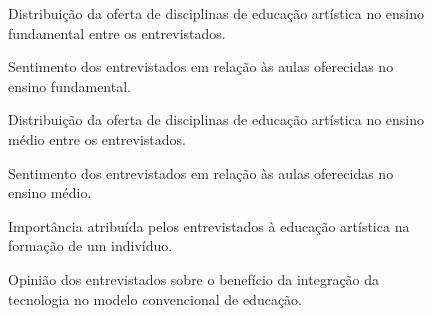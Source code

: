 \documentclass{article}
\begin{document}
	\newpage
	\begin{figure}[H]
		\centering
		\caption{Distribuição da oferta de disciplinas de educação artística no ensino fundamental entre os entrevistados.}
		\label{fig:q4}
	\end{figure}

	\newpage
	\begin{figure}[H]
		\centering
		\caption{Sentimento dos entrevistados em relação às aulas oferecidas no ensino fundamental.}
		\label{fig:q5}
	\end{figure}

	\newpage
	\begin{figure}[H]
		\centering
		\caption{Distribuição da oferta de disciplinas de educação artística no ensino médio entre os entrevistados.}
		\label{fig:q6}
	\end{figure}

	\newpage
	\begin{figure}[H]
		\centering
		\caption{Sentimento dos entrevistados em relação às aulas oferecidas no ensino médio.}
		\label{fig:q7}
	\end{figure}

	\newpage
	\begin{figure}[H]
		\centering
		\caption{Importância atribuída pelos entrevistados à educação artística na formação de um indivíduo.}
		\label{fig:q8}
	\end{figure}

	\newpage
	\begin{figure}[H]
		\centering
		\caption{Opinião dos entrevistados sobre o benefício da integração da tecnologia no modelo convencional de educação.}
		\label{fig:q9}
	\end{figure}
\end{document}
